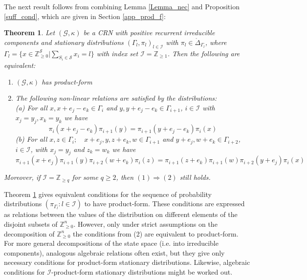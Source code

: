 \documentclass{amsart}
\newtheorem{theorem}{Theorem}[section]
\theoremstyle{definition}
\theoremstyle{remark}
\theoremstyle{Conjecture/open problem}
\theoremstyle{assumption}
\theoremstyle{conjecture}
\newcommand{\intval}{q}
\def\I{\mathcal{I}}
\def\Ga{\Gamma}
\def\k{\kappa}
\def\cS{\mathcal{S}}
\def\Z{\mathbb{Z}}
\numberwithin{equation}{section}
\begin{document}
The next result follows from combining Lemma \ref{Lemma_nec} and Proposition \ref{suff_cond}, which are given in Section \ref{app_prod_f}:
\begin{theorem}\label{suff_condn}  Let $(\mathcal{G}, \k)$ be a CRN with positive recurrent irreducible components and stationary distributions $(\Ga_l,\pi_l)_{l\in \mathcal{I}}$ with $\pi_l\in \mathring\Delta_{\Ga_l}$, where\\
$\Ga_l=\{x\in \Z^\cS_{\geq 0}|\sum_{S_i\in \cS} x_i=l\}$ with index set 
$\mathcal{I}=\Z_{\geq 1}$. Then the following are equivalent:
\begin{enumerate}
\item $(\mathcal{G}, \k)$ has product-form
\item The following non-linear relations are satisfied by the distributions:\\
(a) For all $x,x+e_j-e_k\in \Ga_i$ and $y,y+e_j-e_k\in \Ga_{i+1}$, $i\in \mathcal{I}$  with $x_j=y_j,x_k=y_k$ we have
$$\pi_{i}(x+e_j-e_k)\pi_{i+1}(y)=\pi_{i+1}(y+e_j-e_k)\pi_i(x)   $$
(b) For all $x,z\in \Ga_i;\quad x+e_j,y,z+e_k,w\in \Ga_{i+1}$ and $y+e_j,w+e_k\in \Ga_{i+2}$, $i\in \mathcal{I}$, with $x_j=y_j$ and $z_k=w_k$ we have
$$\pi_{i+1}(x+e_j)\pi_{i+1}(y)\pi_{i+2}(w+e_k)\pi_i(z)=\pi_{i+1}(z+e_k)\pi_{i+1}(w)\pi_{i+2}(y+e_j)\pi_i(x)$$
\end{enumerate}
 Moreover, if $\mathcal{I}=\Z_{\geq \intval}$ for some $\intval\geq 2$, then $(1)\Rightarrow (2)$ still holds. 
\end{theorem}

 Theorem \ref{suff_condn} gives equivalent conditions for the sequence of probability distributions $(\pi _{\Gamma _l}:l\in \mathcal{I})$ to have product-form. These conditions are expressed as relations between the values of the distribution on different elements of the disjoint subsets of $\Z_{\geq 0}^n$. However, only under strict assumptions on the decomposition of $\Z_{\geq 0}^n$ the conditions from (2) are equivalent to product-form. For more general decompositions of the state space (i.e. into irreducible components), analogous algebraic relations often exist, but they give only necessary conditions for product-form stationary distributions. Likewise, algebraic conditions for $\I$-product-form stationary distributions might be worked out. 
\end{document}
